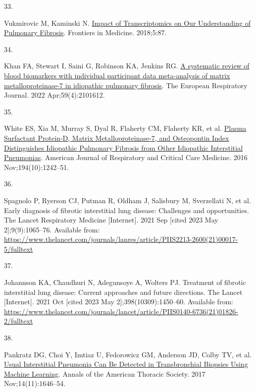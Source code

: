 \documentclass[
]{article}
\newlength{\cslhangindent}
\newlength{\csllabelwidth}
\newenvironment{CSLReferences}[2] %
 {\begin{list}{}{%
  \setlength{\itemindent}{0pt}
  \setlength{\leftmargin}{0pt}
  \setlength{\parsep}{0pt}
  \ifodd #1
   \setlength{\leftmargin}{\cslhangindent}
   \setlength{\itemindent}{-1\cslhangindent}
  \fi
  \setlength{\itemsep}{#2\baselineskip}}}
 {\end{list}}
\newcommand{\CSLLeftMargin}[1]{\parbox[t]{\csllabelwidth}{\strut#1\strut}}
\newcommand{\CSLRightInline}[1]{\parbox[t]{\linewidth - \csllabelwidth}{\strut#1\strut}}
\begin{document}
\begin{CSLReferences}{0}{1}
\CSLLeftMargin{33. }%
\CSLRightInline{Vukmirovic M, Kaminski N. \href{https://doi.org/10.3389/fmed.2018.00087}{Impact of {Transcriptomics} on {Our} {Understanding} of {Pulmonary} {Fibrosis}}. Frontiers in Medicine. 2018;5:87. }

\CSLLeftMargin{34. }%
\CSLRightInline{Khan FA, Stewart I, Saini G, Robinson KA, Jenkins RG. \href{https://doi.org/10.1183/13993003.01612-2021}{A systematic review of blood biomarkers with individual participant data meta-analysis of matrix metalloproteinase-7 in idiopathic pulmonary fibrosis}. The European Respiratory Journal. 2022 Apr;59(4):2101612. }

\CSLLeftMargin{35. }%
\CSLRightInline{White ES, Xia M, Murray S, Dyal R, Flaherty CM, Flaherty KR, et al. \href{https://doi.org/10.1164/rccm.201505-0862OC}{Plasma {Surfactant} {Protein}-{D}, {Matrix} {Metalloproteinase}-7, and {Osteopontin} {Index} {Distinguishes} {Idiopathic} {Pulmonary} {Fibrosis} from {Other} {Idiopathic} {Interstitial} {Pneumonias}}. American Journal of Respiratory and Critical Care Medicine. 2016 Nov;194(10):1242--51. }

\CSLLeftMargin{36. }%
\CSLRightInline{Spagnolo P, Ryerson CJ, Putman R, Oldham J, Salisbury M, Sverzellati N, et al. Early diagnosis of fibrotic interstitial lung disease: Challenges and opportunities. The Lancet Respiratory Medicine {[}Internet{]}. 2021 Sep {[}cited 2023 May 2{]};9(9):1065--76. Available from: \url{https://www.thelancet.com/journals/lanres/article/PIIS2213-2600(21)00017-5/fulltext}}

\CSLLeftMargin{37. }%
\CSLRightInline{Johannson KA, Chaudhuri N, Adegunsoye A, Wolters PJ. Treatment of fibrotic interstitial lung disease: Current approaches and future directions. The Lancet {[}Internet{]}. 2021 Oct {[}cited 2023 May 2{]};398(10309):1450--60. Available from: \url{https://www.thelancet.com/journals/lancet/article/PIIS0140-6736(21)01826-2/fulltext}}

\CSLLeftMargin{38. }%
\CSLRightInline{Pankratz DG, Choi Y, Imtiaz U, Fedorowicz GM, Anderson JD, Colby TV, et al. \href{https://doi.org/10.1513/AnnalsATS.201612-947OC}{Usual {Interstitial} {Pneumonia} {Can} {Be} {Detected} in {Transbronchial} {Biopsies} {Using} {Machine} {Learning}}. Annals of the American Thoracic Society. 2017 Nov;14(11):1646--54. }


\end{CSLReferences}
\end{document}
